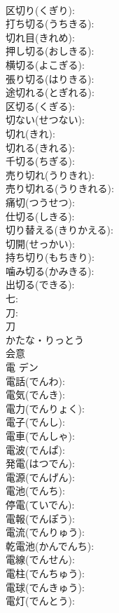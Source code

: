 \documentclass[8pt]{extreport}
\begin{document}
\begin{CJK}{UTF8}{min}
\\	区切り(くぎり): 
\\	打ち切る(うちきる): 
\\	切れ目(きれめ): 
\\	押し切る(おしきる): 
\\	横切る(よこぎる): 
\\	張り切る(はりきる): 
\\	途切れる(とぎれる): 
\\	区切る(くぎる): 
\\	切ない(せつない): 
\\	切れ(きれ): 
\\	切れる(きれる): 
\\	千切る(ちぎる): 
\\	売り切れ(うりきれ): 
\\	売り切れる(うりきれる): 
\\	痛切(つうせつ): 
\\	仕切る(しきる): 
\\	切り替える(きりかえる): 
\\	切開(せっかい): 
\\	持ち切り(もちきり): 
\\	噛み切る(かみきる): 
\\	出切る(できる): 
\\	七: 
\\	刀: 
\\	刀	
\\	かたな・りっとう	
\\	会意 
\\	電	デン			
\\	電話(でんわ): 
\\	電気(でんき): 
\\	電力(でんりょく): 
\\	電子(でんし): 
\\	電車(でんしゃ): 
\\	電波(でんぱ): 
\\	発電(はつでん): 
\\	電源(でんげん): 
\\	電池(でんち): 
\\	停電(ていでん): 
\\	電報(でんぽう): 
\\	電流(でんりゅう): 
\\	乾電池(かんでんち): 
\\	電線(でんせん): 
\\	電柱(でんちゅう): 
\\	電球(でんきゅう): 
\\	電灯(でんとう): 

\end{CJK}
\end{document}
